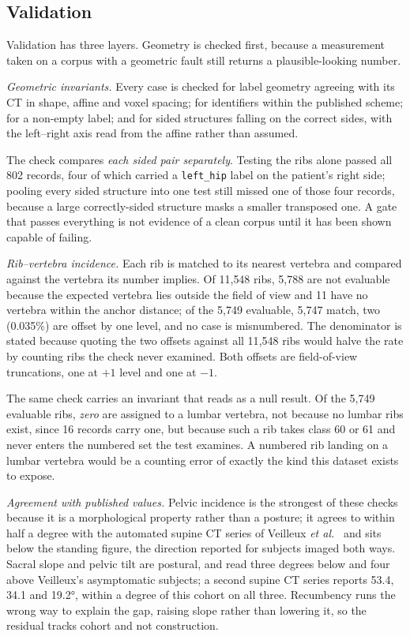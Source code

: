 \documentclass[aapm,mph,amsmath,amssymb,reprint]{revtex4-2}
\begin{document}
\subsection{Validation}
\label{sec:validation}


Validation has three layers. Geometry is checked first, because a measurement taken on a corpus with a geometric fault still returns a plausible-looking number.

\emph{Geometric invariants.} Every case is checked for label geometry agreeing with its CT
in shape, affine and voxel spacing; for identifiers within the published scheme; for a
non-empty label; and for sided structures falling on the correct sides, with the left--right
axis read from the affine rather than assumed. 

The check compares \emph{each sided pair separately}. Testing the ribs alone passed all
802 records, four of which carried a \texttt{left\_hip} label on the patient's right side;
pooling every sided structure into one test still missed one of those four records, because
a large correctly-sided structure masks a smaller transposed one. A gate that passes everything is
not evidence of a clean corpus until it has been shown capable of failing.

\emph{Rib--vertebra incidence.} Each rib is matched to its nearest vertebra and compared
against the vertebra its number implies. Of 11{,}548 ribs, 5{,}788 are not evaluable
because the expected vertebra lies outside the field of view and 11 have no vertebra within
the anchor distance; of the 5{,}749 evaluable, 5{,}747 match, two (0.035\%) are offset by one
level, and no case is misnumbered. The denominator is stated because quoting the two offsets against all 11{,}548 ribs would
halve the rate by counting ribs the check never examined. Both offsets are field-of-view
truncations, one at $+1$ level and one at $-1$.

The same check carries an invariant that reads as a null result. Of the 5{,}749 evaluable
ribs, \emph{zero} are assigned to a lumbar vertebra, not because no lumbar ribs exist,
since 16 records carry one, but because such a rib takes class 60 or 61 and never enters the
numbered set the test examines. A numbered rib landing on a lumbar vertebra would be a
counting error of exactly the kind this dataset exists to expose.

\emph{Agreement with published values.} Pelvic incidence is the strongest of these checks
because it is a morphological property rather than a posture; it agrees to within half a
degree with the automated supine CT series of Veilleux \emph{et al.}~\cite{veilleux2020}
and sits below the standing figure, the direction reported for subjects imaged both
ways.\cite{leeliu2022} Sacral slope and pelvic tilt are postural, and read three degrees
below and four above Veilleux's asymptomatic subjects; a second supine CT series reports
53.4, 34.1 and 19.2\si{\degree}, within a degree of this cohort on all
three.\cite{hasegawa2018} Recumbency runs the wrong way to explain the gap, raising slope
rather than lowering it, so the residual tracks cohort and not construction.
\end{document}
